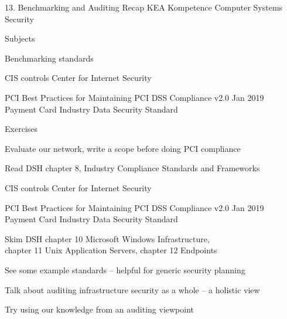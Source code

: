 \documentclass[Screen16to9,17pt]{foils}
\begin{document}
\mytitlepage
{13. Benchmarking and Auditing Recap}
{KEA Kompetence Computer Systems Security \the\year}



\begin{list1}
\item Subjects
\begin{list2}
\item Benchmarking standards
\item CIS controls Center for Internet Security
\item PCI Best Practices for Maintaining PCI DSS Compliance v2.0 Jan 2019\\
Payment Card Industry Data Security Standard

\end{list2}
\item Exercises
\begin{list2}
\item Evaluate our network, write a scope before doing PCI compliance
\end{list2}
\end{list1}


\begin{list1}
\item Read DSH chapter 8, Industry Compliance Standards and Frameworks\\
\item CIS controls Center for Internet Security
\item PCI Best Practices for Maintaining PCI DSS Compliance v2.0 Jan 2019\\
Payment Card Industry Data Security Standard
\item Skim DSH chapter 10 Microsoft Windows Infrastructure, \\
chapter 11 Unix Application Servers, chapter 12 Endpoints

\end{list1}



 
\begin{list2}
\item See some example standards -- helpful for generic security planning
\item Talk about auditing infrastructure security as a whole -- a holistic view
\item Try using our knowledge from an auditing viewpoint
\end{list2}
\end{document}
